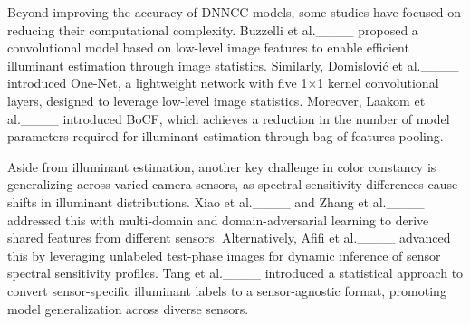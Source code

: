\par Beyond improving the accuracy of DNNCC models, some studies have focused on reducing their computational complexity. Buzzelli et al.____ proposed a convolutional model based on low-level image features to enable efficient illuminant estimation through image statistics. Similarly, Domislović et al.____ introduced One-Net, a lightweight network with five 1$\times$1 kernel convolutional layers, designed to leverage low-level image statistics. Moreover, Laakom et al.____ introduced BoCF, which achieves a reduction in the number of model parameters required for illuminant estimation through bag-of-features pooling.
\par Aside from illuminant estimation, another key challenge in color constancy is generalizing across varied camera sensors, as spectral sensitivity differences cause shifts in illuminant distributions. Xiao et al.____ and Zhang et al.____ addressed this with multi-domain and domain-adversarial learning to derive shared features from different sensors. Alternatively, Afifi et al.____ advanced this by leveraging unlabeled test-phase images for dynamic inference of sensor spectral sensitivity profiles. Tang et al.____ introduced a statistical approach to convert sensor-specific illuminant labels to a sensor-agnostic format, promoting model generalization across diverse sensors.


